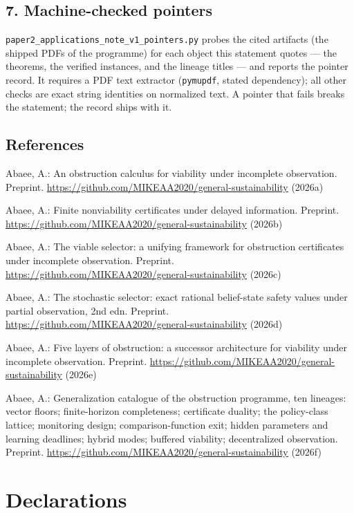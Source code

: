\documentclass[10pt,twocolumn]{article}
\theoremstyle{definition}
\begin{document}
\subsection{7. Machine-checked pointers}\label{pointers}

\texttt{paper2\_applications\_note\_v1\_pointers.py} probes the cited
artifacts (the shipped PDFs of the programme) for each object this
statement quotes --- the theorems, the verified instances, and the
lineage titles --- and reports the pointer record. It requires a PDF text
extractor (\texttt{pymupdf}, stated dependency); all other checks are
exact string identities on normalized text. A pointer that fails breaks
the statement; the record ships with it.

\subsection{References}\label{references}
{\footnotesize

Abaee, A.: An obstruction calculus for viability under incomplete
observation. Preprint.
\url{https://github.com/MIKEAA2020/general-sustainability} (2026a)

Abaee, A.: Finite nonviability certificates under delayed information.
Preprint. \url{https://github.com/MIKEAA2020/general-sustainability} (2026b)

Abaee, A.: The viable selector: a unifying framework for obstruction
certificates under incomplete observation. Preprint.
\url{https://github.com/MIKEAA2020/general-sustainability} (2026c)

Abaee, A.: The stochastic selector: exact rational belief-state safety
values under partial observation, 2nd edn. Preprint.
\url{https://github.com/MIKEAA2020/general-sustainability} (2026d)

Abaee, A.: Five layers of obstruction: a successor architecture for
viability under incomplete observation. Preprint.
\url{https://github.com/MIKEAA2020/general-sustainability} (2026e)

Abaee, A.: Generalization catalogue of the obstruction programme, ten
lineages: vector floors; finite-horizon completeness; certificate
duality; the policy-class lattice; monitoring design; comparison-function
exit; hidden parameters and learning deadlines; hybrid modes; buffered
viability; decentralized observation. Preprint.
\url{https://github.com/MIKEAA2020/general-sustainability} (2026f)

}

\section*{Declarations}
\end{document}
